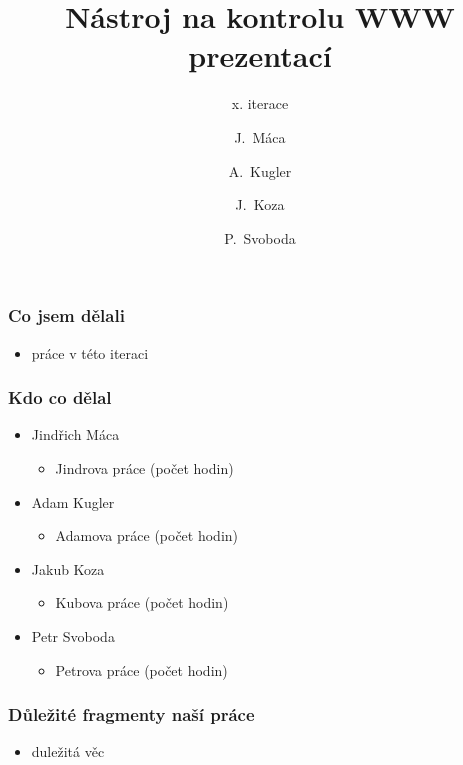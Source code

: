 \documentclass{beamer}
\begin{document}
\title [NKWP]{Nástroj na kontrolu WWW prezentací}
\author[Máca, Kugler, Koza, Svoboda]{J.~Máca \and A.~Kugler \and J.~Koza \and P.~Svoboda}

\subtitle{x. iterace}
\frame{\titlepage}
\begin{frame}[allowframebreaks]\frametitle{Co jsem dělali}
   \begin{itemize}
    \item práce v této iteraci
   \end{itemize}
\end{frame}

\begin{frame}[allowframebreaks]\frametitle{Kdo co dělal} 
  \begin{itemize}
    \item Jindřich Máca
      \begin{itemize}
       \item Jindrova práce (počet hodin)
     \end{itemize}

    \item Adam Kugler
      \begin{itemize}
       \item Adamova práce (počet hodin)
     \end{itemize}

    \item Jakub Koza
      \begin{itemize}
       \item Kubova práce (počet hodin)
     \end{itemize}

    \item Petr Svoboda
      \begin{itemize}
       \item Petrova práce (počet hodin)
     \end{itemize}
   \end{itemize}  
\end{frame} 

\begin{frame}[allowframebreaks]\frametitle{Důležité fragmenty naší práce}
  \begin{itemize}
    \item duležitá věc %
  \end{itemize}
\end{frame}
\end{document}
